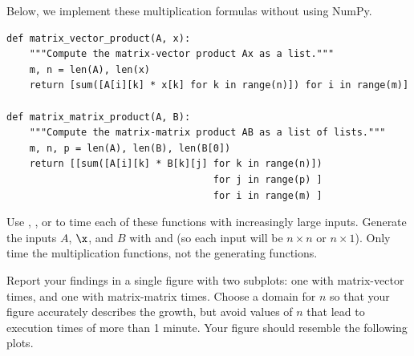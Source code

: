 \begin{problem}
Below, we implement these multiplication formulas without using NumPy.

\begin{lstlisting}
def matrix_vector_product(A, x):
    """Compute the matrix-vector product Ax as a list."""
    m, n = len(A), len(x)
    return [sum([A[i][k] * x[k] for k in range(n)]) for i in range(m)]

def matrix_matrix_product(A, B):
    """Compute the matrix-matrix product AB as a list of lists."""
    m, n, p = len(A), len(B), len(B[0])
    return [[sum([A[i][k] * B[k][j] for k in range(n)])
                                    for j in range(p) ]
                                    for i in range(m) ]
\end{lstlisting}

Use , , or  to time each of these functions with increasingly large inputs.
Generate the inputs $A$, $\x$, and $B$ with  and  (so each input will be $n \times n$ or $n \times 1$).
Only time the multiplication functions, not the generating functions.

Report your findings in a single figure with two subplots: one with matrix-vector times, and one with matrix-matrix times.
Choose a domain for $n$ so that your figure accurately describes the growth, but avoid values of $n$ that lead to execution times of more than 1 minute.
Your figure should resemble the following plots.


\end{problem}
